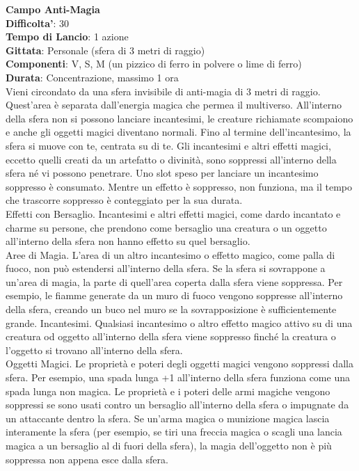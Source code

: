 \begin{multicols}{2}
\medskip\textbf{Campo Anti-Magia}\\
\textbf{Difficolta'}: 30\\
\textbf{Tempo di Lancio}: 1 azione\\
\textbf{Gittata}: Personale (sfera di 3 metri di raggio)\\
\textbf{Componenti}: V, S, M (un pizzico di ferro in polvere o lime di ferro)\\
\textbf{Durata}: Concentrazione, massimo 1 ora\\
Vieni circondato da una sfera invisibile di anti-magia di 3 metri di raggio. Quest’area è separata dall’energia magica che permea il multiverso. All’interno della sfera non si possono lanciare incantesimi, le creature richiamate scompaiono e anche gli oggetti magici diventano normali. Fino al termine dell’incantesimo, la sfera si muove con te, centrata su di te. Gli incantesimi e altri effetti magici, eccetto quelli creati da un artefatto o divinità, sono soppressi all’interno della sfera né vi possono penetrare. Uno slot speso per lanciare un incantesimo soppresso è consumato. Mentre un effetto è soppresso, non funziona, ma il tempo che trascorre soppresso è conteggiato per la sua durata. 
\\Effetti con Bersaglio. Incantesimi e altri effetti magici, come dardo incantato e charme su persone, che prendono come bersaglio una creatura o un oggetto all’interno della sfera non hanno effetto su quel bersaglio.
\\Aree di Magia. L’area di un altro incantesimo o effetto magico, come palla di fuoco, non può estendersi all’interno della sfera. Se la sfera si sovrappone a un’area di magia, la parte di quell’area coperta dalla sfera viene soppressa. Per esempio, le fiamme generate da un muro di fuoco vengono soppresse all’interno della sfera, creando un buco nel muro se la sovrapposizione è sufficientemente grande. Incantesimi. Qualsiasi incantesimo o altro effetto magico attivo su di una creatura od oggetto all’interno della sfera viene soppresso finché la creatura o l’oggetto si trovano all’interno della sfera.\\
Oggetti Magici. Le proprietà e poteri degli oggetti magici vengono soppressi dalla sfera. Per esempio, una spada lunga +1 all’interno della sfera funziona come una spada lunga non magica. Le proprietà e i poteri delle armi magiche vengono soppressi se sono usati contro un bersaglio all’interno  della sfera o impugnate da un attaccante dentro la sfera. Se un’arma magica o munizione magica lascia interamente la sfera (per esempio, se tiri una freccia magica o scagli una lancia magica a un bersaglio al di fuori della sfera), la magia dell’oggetto non è più soppressa non appena esce dalla sfera.

\end{multicols}
